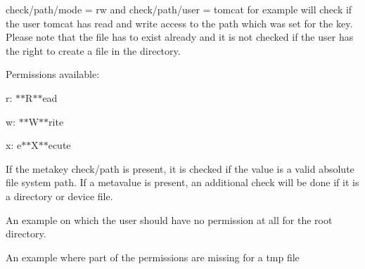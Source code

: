 {\ttfamily check/path/mode = rw} and {\ttfamily check/path/user = tomcat} for example will check if the user {\ttfamily tomcat} has read and write access to the path which was set for the key. Please note that the file has to exist already and it is not checked if the user has the right to create a file in the directory.

Permissions available\+:


\begin{DoxyItemize}
\item {\ttfamily r}\+: $\ast$$\ast$\+R$\ast$$\ast$ead
\item {\ttfamily w}\+: $\ast$$\ast$\+W$\ast$$\ast$rite
\item {\ttfamily x}\+: e$\ast$$\ast$\+X$\ast$$\ast$ecute
\end{DoxyItemize}

If the metakey {\ttfamily check/path} is present, it is checked if the value is a valid absolute file system path. If a metavalue is present, an additional check will be done if it is a directory or device file.

An example on which the user should have no permission at all for the root directory.


\begin{DoxyCode}{0}
\DoxyCodeLine{}
\DoxyCodeLine{}
\DoxyCodeLine{}
\end{DoxyCode}


An example where part of the permissions are missing for a tmp file

